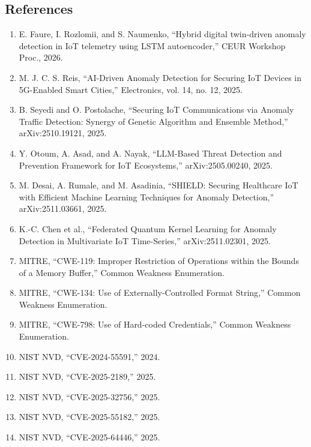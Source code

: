 \documentclass[11pt]{article}
\begin{document}
\subsection{References}
\begin{enumerate}
    \item E. Faure, I. Rozlomii, and S. Naumenko, ``Hybrid digital twin-driven anomaly detection in IoT telemetry using LSTM autoencoder,'' CEUR Workshop Proc., 2026.
    \item M. J. C. S. Reis, ``AI-Driven Anomaly Detection for Securing IoT Devices in 5G-Enabled Smart Cities,'' Electronics, vol. 14, no. 12, 2025.
    \item B. Seyedi and O. Postolache, ``Securing IoT Communications via Anomaly Traffic Detection: Synergy of Genetic Algorithm and Ensemble Method,'' arXiv:2510.19121, 2025.
    \item Y. Otoum, A. Asad, and A. Nayak, ``LLM-Based Threat Detection and Prevention Framework for IoT Ecosystems,'' arXiv:2505.00240, 2025.
    \item M. Desai, A. Rumale, and M. Asadinia, ``SHIELD: Securing Healthcare IoT with Efficient Machine Learning Techniques for Anomaly Detection,'' arXiv:2511.03661, 2025.
    \item K.-C. Chen et al., ``Federated Quantum Kernel Learning for Anomaly Detection in Multivariate IoT Time-Series,'' arXiv:2511.02301, 2025.
    \item MITRE, ``CWE-119: Improper Restriction of Operations within the Bounds of a Memory Buffer,'' Common Weakness Enumeration.
    \item MITRE, ``CWE-134: Use of Externally-Controlled Format String,'' Common Weakness Enumeration.
    \item MITRE, ``CWE-798: Use of Hard-coded Credentials,'' Common Weakness Enumeration.
    \item NIST NVD, ``CVE-2024-55591,'' 2024.
    \item NIST NVD, ``CVE-2025-2189,'' 2025.
    \item NIST NVD, ``CVE-2025-32756,'' 2025.
    \item NIST NVD, ``CVE-2025-55182,'' 2025.
    \item NIST NVD, ``CVE-2025-64446,'' 2025.
\end{enumerate}
\end{document}
